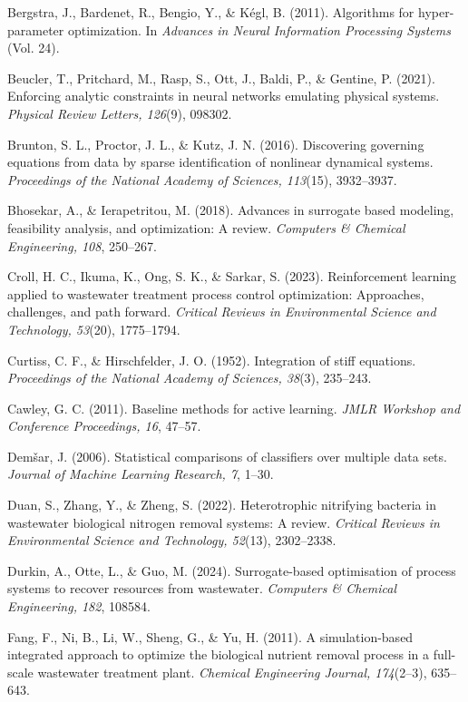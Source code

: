 \documentclass[a4paper,fleqn]{cas-sc}
\begin{document}
\noindent Bergstra, J., Bardenet, R., Bengio, Y., \& K\'egl, B. (2011). Algorithms for hyper-parameter optimization. In \textit{Advances in Neural Information Processing Systems} (Vol. 24).

\noindent Beucler, T., Pritchard, M., Rasp, S., Ott, J., Baldi, P., \& Gentine, P. (2021). Enforcing analytic constraints in neural networks emulating physical systems. \textit{Physical Review Letters, 126}(9), 098302.

\noindent Brunton, S. L., Proctor, J. L., \& Kutz, J. N. (2016). Discovering governing equations from data by sparse identification of nonlinear dynamical systems. \textit{Proceedings of the National Academy of Sciences, 113}(15), 3932--3937.

\noindent Bhosekar, A., \& Ierapetritou, M. (2018). Advances in surrogate based modeling, feasibility analysis, and optimization: A review. \textit{Computers \& Chemical Engineering, 108}, 250--267.

\noindent Croll, H. C., Ikuma, K., Ong, S. K., \& Sarkar, S. (2023). Reinforcement learning applied to wastewater treatment process control optimization: Approaches, challenges, and path forward. \textit{Critical Reviews in Environmental Science and Technology, 53}(20), 1775--1794.

\noindent Curtiss, C. F., \& Hirschfelder, J. O. (1952). Integration of stiff equations. \textit{Proceedings of the National Academy of Sciences, 38}(3), 235--243.

\noindent Cawley, G. C. (2011). Baseline methods for active learning. \textit{JMLR Workshop and Conference Proceedings, 16}, 47--57.

\noindent Dem\v{s}ar, J. (2006). Statistical comparisons of classifiers over multiple data sets. \textit{Journal of Machine Learning Research, 7}, 1--30.

\noindent Duan, S., Zhang, Y., \& Zheng, S. (2022). Heterotrophic nitrifying bacteria in wastewater biological nitrogen removal systems: A review. \textit{Critical Reviews in Environmental Science and Technology, 52}(13), 2302--2338.

\noindent Durkin, A., Otte, L., \& Guo, M. (2024). Surrogate-based optimisation of process systems to recover resources from wastewater. \textit{Computers \& Chemical Engineering, 182}, 108584.

\noindent Fang, F., Ni, B., Li, W., Sheng, G., \& Yu, H. (2011). A simulation-based integrated approach to optimize the biological nutrient removal process in a full-scale wastewater treatment plant. \textit{Chemical Engineering Journal, 174}(2--3), 635--643.
\end{document}
